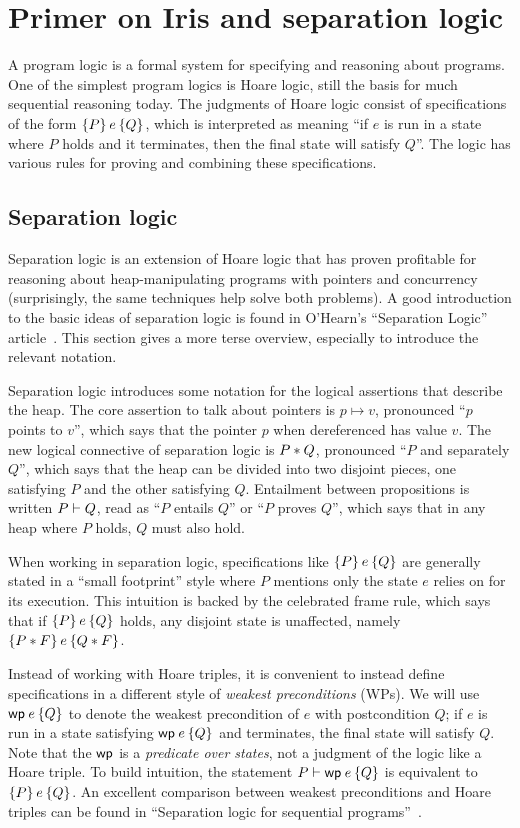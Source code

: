 \section{Primer on Iris and separation logic}%
\label{sec:perennial:iris}

A program logic is a formal system for specifying and reasoning about programs.
One of the simplest program logics is Hoare logic, still the basis for much
sequential reasoning today. The judgments of Hoare logic consist of
specifications of the form $\hoare{P}{e}{Q}$, which is interpreted as meaning
``if $e$ is run in a state where $P$ holds and it terminates, then the final
state will satisfy $Q$''. The logic has various rules for proving and combining
these specifications.

\subsection{Separation logic}

Separation logic is an extension of Hoare logic that has proven profitable for
reasoning about heap-manipulating programs with pointers and concurrency
(surprisingly, the same techniques help solve both problems). A good
introduction to the basic ideas of separation logic is found in O'Hearn's
``Separation Logic'' article~\cite{ohearn:seplogic}. This section gives a more
terse overview, especially to introduce the relevant notation.

Separation logic introduces some notation for the logical assertions that
describe the heap. The core assertion to talk about pointers is $p \mapsto v$,
pronounced ``$p$ points to $v$'',
which says that the pointer $p$ when dereferenced has value $v$. The new logical
connective of separation logic is
$P * Q$, pronounced ``$P$ and separately $Q$'', which says that the heap can
be divided into two disjoint pieces, one satisfying $P$ and the other satisfying
$Q$. Entailment between propositions is written $P \vdash Q$, read as ``$P$
entails $Q$'' or ``$P$ proves $Q$'', which says that in any heap where $P$
holds, $Q$ must also hold.

When working in separation logic, specifications like $\hoare{P}{e}{Q}$ are
generally stated in a ``small footprint'' style where $P$ mentions only the
state $e$ relies on for its execution. This intuition is backed by the
celebrated frame rule, which says that if $\hoare{P}{e}{Q}$ holds, any disjoint
state is unaffected, namely $\hoare{P \sep F}{e}{Q \sep F}$.

Instead of working with Hoare triples, it is convenient to instead define
specifications in a different style of \emph{weakest preconditions} (WPs). We will use
$\wpre{e}{Q}$ to denote the weakest precondition of $e$ with postcondition $Q$;
if $e$ is run in a state satisfying $\wpre{e}{Q}$ and terminates, the final
state will satisfy $Q$. Note that the $\textsf{\upshape wp}$ is a \emph{predicate over
states}, not a judgment of the logic like a Hoare triple. To build intuition, the statement
$P \proves \wpre{e}{Q}$ is equivalent to $\hoare{P}{e}{Q}$. An excellent
comparison between weakest preconditions and Hoare triples can be found in
``Separation logic for sequential programs''~\cite{chargueraud:seq-seplogic}.

